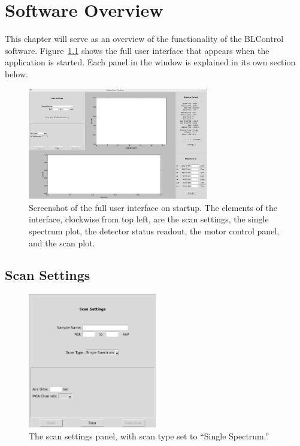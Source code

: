 \chapter{Software Overview\label{sec:software}}

This chapter will serve as an overview of the functionality of the BLControl software. Figure~\ref{fig:ui} shows the full user interface that appears when the application is started. Each panel in the window is explained in its own section below.

\begin{figure}
\centering
\includegraphics[width=0.7\textwidth]{fullui.png}
\caption{\label{fig:ui} Screenshot of the full user interface on startup. The elements of the interface, clockwise from top left, are the scan settings, the single spectrum plot, the detector status readout, the motor control panel, and the scan plot.}
\end{figure}

\section{Scan Settings}

\begin{figure}
\centering
\includegraphics[width=0.5\textwidth]{scansettings.png}
\caption{\label{fig:scanset} The scan settings panel, with scan type set to ``Single Spectrum.''}
\end{figure}

